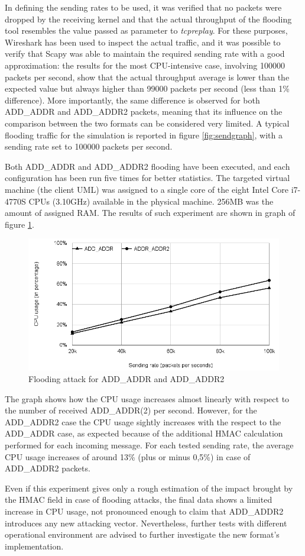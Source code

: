 In defining the sending rates to be used, it was verified that no packets were dropped by the receiving kernel and that the actual throughput of the flooding tool resembles the value passed as parameter to \textit{tcpreplay}. For these purposes, Wireshark has been used to inspect the actual traffic, and it was possible to verify that Scapy was able to maintain the required sending rate with a good approximation: the results for the most CPU-intensive case, involving 100000 packets per second, show that the actual throughput average is lower than the expected value but always higher than 99000 packets per second (less than 1\% difference). More importantly, the same difference is observed for both ADD\_ADDR and ADD\_ADDR2 packets, meaning that its influence on the comparison between the two formats can be considered very limited. A typical flooding traffic for the simulation is reported in figure \ref{fig:sendgraph}, with a sending rate set to 100000 packets per second.

Both ADD\_ADDR and ADD\_ADDR2 flooding have been executed, and each configuration has been run five times for better statistics. The targeted virtual machine (the client UML) was assigned to a single core of the eight Intel Core i7-4770S CPUs (3.10GHz) available in the physical machine. 256MB was the amount of assigned RAM. The results of such experiment are shown in graph of figure \ref{fig:floodgraph}.

\begin{figure}[!htb]
\centering
\includegraphics[width=\textwidth]{images/flood}
\caption{Flooding attack for ADD\_ADDR and ADD\_ADDR2}
\label{fig:floodgraph}
\end{figure} 

The graph shows how the CPU usage increases almost linearly with respect to the number of received ADD\_ADDR(2) per second. However, for the ADD\_ADDR2 case the CPU usage sightly increases with the respect to the ADD\_ADDR case, as expected because of the additional HMAC calculation performed for each incoming message. For each tested sending rate, the average CPU usage increases of around 13\% (plus or minus 0,5\%) in case of ADD\_ADDR2 packets.

Even if this experiment gives only a rough estimation of the impact brought by the HMAC field in case of flooding attacks, the final data shows a limited increase in CPU usage, not pronounced enough to claim that ADD\_ADDR2 introduces any new attacking vector. Nevertheless, further tests with different operational environment are advised to further investigate the new format's implementation.